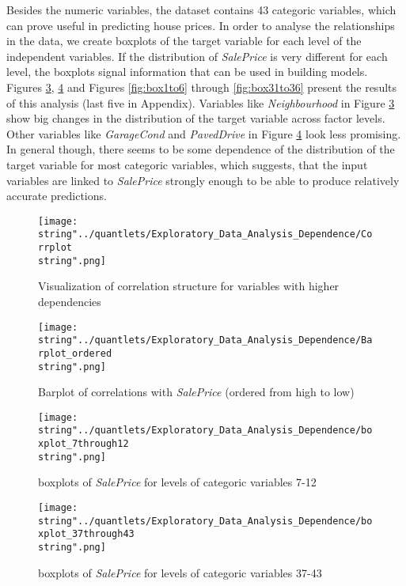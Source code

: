 Besides the numeric variables, the dataset contains 43 categoric variables, which can prove useful in predicting house prices. In order to analyse the relationships in the data, we create boxplots of the target variable for each level of the independent variables. If the distribution of \textit{SalePrice} is very different for each level, the boxplots signal information that can be used in building models. Figures \ref{fig:box7to12}, \ref{fig:box37to43} and Figures  \ref{fig:box1to6} through \ref{fig:box31to36} present the results of this analysis (last five in Appendix). Variables like \textit{Neighbourhood} in Figure \ref{fig:box7to12} show big changes in the distribution of the target variable across factor levels. Other variables like \textit{GarageCond} and \textit{PavedDrive} in Figure \ref{fig:box37to43} look less promising. In general though, there seems to be some dependence of the distribution of the target variable for most categoric variables, which suggests, that the input variables are  linked to \textit{SalePrice} strongly enough to be able to produce relatively accurate predictions. 
\begin{figure}[H]
  \centering
\texttt{[image: \\string"../quantlets/Exploratory\_Data\_Analysis\_Dependence/Corrplot\\string".png]}
  \caption{Visualization of correlation structure for variables with higher dependencies}\label{fig:corrgram}
\end{figure}

\begin{figure}[H]
  \centering
\texttt{[image: \\string"../quantlets/Exploratory\_Data\_Analysis\_Dependence/Barplot\_ordered\\string".png]}
  \caption{Barplot of correlations with \textit{SalePrice} (ordered from high to low)}\label{fig:barplot_ordered}
\end{figure}

\begin{figure}[H]
\centering
\texttt{[image: \\string"../quantlets/Exploratory\_Data\_Analysis\_Dependence/boxplot\_7through12\\string".png]}
\caption{boxplots of \textit{SalePrice} for levels of categoric variables 7-12}
\label{fig:box7to12}
\end{figure}

\begin{figure}[H]
\centering
	\texttt{[image: \\string"../quantlets/Exploratory\_Data\_Analysis\_Dependence/boxplot\_37through43\\string".png]}
  	\caption{boxplots of \textit{SalePrice} for levels of categoric variables 37-43}
  	\label{fig:box37to43}
\end{figure}




